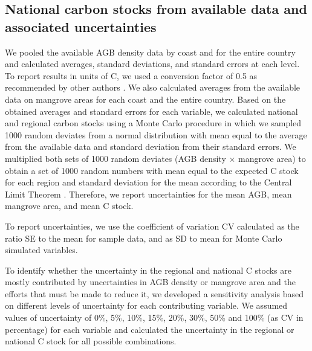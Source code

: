 \documentclass[review, authoryear]{elsarticle}   	%
\begin{document}
\subsection{National carbon stocks from available data and associated uncertainties}
We pooled the available AGB density data by coast and for the entire country and calculated averages, standard deviations, and standard errors at each level. To report results in units of C, we used a conversion factor of 0.5 as recommended by other authors \citep{MacDicken1997, Clark2001, Fearnside2004, Chave2005, Aragao2009}. We also calculated averages from the available data on mangrove areas for each coast and the entire country. Based on the obtained averages and standard errors for each variable, we calculated national and regional carbon stocks using a Monte Carlo procedure in which we sampled 1000 random deviates from a normal distribution with mean equal to the average from the available data and standard deviation from their standard errors. We multiplied both sets of 1000 random deviates (AGB density $\times$ mangrove area) to obtain a set of 1000 random numbers with mean equal to the expected C stock for each region and standard deviation for the mean according to the Central Limit Theorem \citep[see also][]{Sierra2007}. Therefore, we report uncertainties for the mean AGB, mean mangrove area, and mean C stock.

To report uncertainties, we use the coefficient of variation CV calculated as the ratio SE to the mean for sample data, and as SD to mean for Monte Carlo simulated variables.

To identify whether the uncertainty in the regional and national C stocks are mostly contributed by uncertainties in AGB density or mangrove area and the efforts that must be made to reduce it, we developed a sensitivity analysis based on different levels of uncertainty for each contributing variable. We assumed values of uncertainty of 0\%, 5\%, 10\%, 15\%, 20\%, 30\%, 50\% and 100\% (as CV in percentage) for each variable and calculated the uncertainty in the regional or national C stock for all possible combinations.

\end{document}
